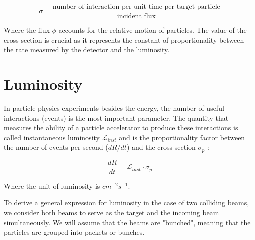\begin{equation}
\sigma=\frac{\text{number of interaction per unit time per target particle}}{\text{incident flux}}
\end{equation}

Where the flux $\phi$ accounts for the relative motion of particles.
The value of the cross section is crucial as it represents the constant of proportionality between the rate measured by the detector and the luminosity.





\section{Luminosity }

In particle physics experiments besides the energy, the number of useful interactions (events) is the most important parameter. The quantity that measures the ability of a particle accelerator to produce these interactions is called instantaneous luminosity $\mathcal{L}_{inst}$ and is the proportionality factor between the number of events per second ($dR/dt$) and the cross section $\sigma_{p}$ \cite{concept_of_luminosity}: 

\begin{equation}
\frac{dR}{dt}=\mathcal{L}_{inst} \cdot \sigma_{p}
\end{equation}

Where the unit of luminosity is $cm^{-2}s^{-1}$. 

To derive a general expression for luminosity in the case of two colliding beams, we consider both beams to serve as the target and the incoming beam simultaneously. We will assume that the beams are "bunched", meaning that the particles are grouped into packets or bunches. 

